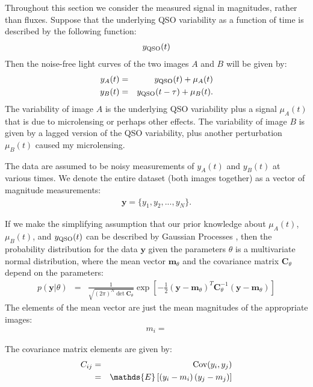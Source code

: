 \documentclass[a4paper, 10pt]{article}
\title{}
\author{}
\date{} %
\newcommand{\yy}{\mathbf{y}}
\newcommand{\mm}{\mathbf{m}_\theta}
\newcommand{\CC}{\mathbf{C}_\theta}
\begin{document}
Throughout this section we consider the measured signal in magnitudes,
rather than fluxes. Suppose that the underlying QSO variability as a function
of time is described by the following function:
\begin{eqnarray}
y_{\rm QSO}(t)
\end{eqnarray}
Then the noise-free light curves of the two images
$A$ and $B$ will be given by:
\begin{eqnarray}
y_A(t) &=& y_{\rm QSO}(t) + \mu_A(t)\\
y_B(t) &=& y_{\rm QSO}(t - \tau) + \mu_B(t).
\end{eqnarray}
The variability of image $A$ is the underlying QSO variability
plus a signal $\mu_A(t)$ that is due to microlensing or perhaps
other effects. The variability of image $B$ is given by
a lagged version of the QSO variability, plus another
perturbation $\mu_B(t)$ caused my microlensing.

The data are assumed to be noisy measurements of $y_A(t)$ and
$y_B(t)$ at various times. We denote the entire dataset (both images together)
as a vector of magnitude measurements:
\begin{eqnarray}
\yy = \{y_1, y_2, ..., y_N\}.
\end{eqnarray}

If we make the simplifying assumption that our prior knowledge about
$\mu_A(t)$, $\mu_B(t)$, and
$y_{\rm QSO}(t)$ can be described by Gaussian Processes \citep{rasmussen},
then the probability distribution for the data $\yy$ given the parameters
$\theta$
is a multivariate normal distribution, where the mean vector $\mm$
and the covariance matrix $\CC$ depend on the parameters:
\begin{eqnarray}
p(\yy | \theta) &=& \frac{1}{\sqrt{(2\pi)^N\det{\CC}}}
\exp\left[
-\frac{1}{2}
\left(
\yy - \mm
\right)^T
\CC^{-1}
\left(
\yy - \mm
\right)
\right]
\end{eqnarray}
The elements of the mean vector are just the mean magnitudes of the
appropriate images:
\begin{eqnarray}
m_i = 
\end{eqnarray}

The covariance matrix elements are given by:
\begin{eqnarray}
C_{ij} &=& \textnormal{Cov}(y_i, y_j) \\
&=& \mathds{E}\left[
\left(y_i - m_i\right)
\left(y_j - m_j\right)
\right]
\end{eqnarray}
\end{document}
